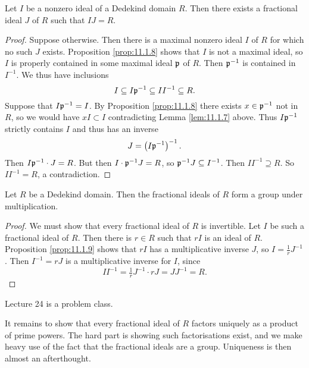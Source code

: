 \begin{proposition}
\label{prop:11.1.9}
Let $ I $ be a nonzero ideal of a Dedekind domain $ R $. Then there exists a fractional ideal $ J $ of $ R $ such that $ IJ = R $.
\end{proposition}

\begin{proof}
Suppose otherwise. Then there is a maximal nonzero ideal $ I $ of $ R $ for which no such $ J $ exists. Proposition \ref{prop:11.1.8} shows that $ I $ is not a maximal ideal, so $ I $ is properly contained in some maximal ideal $ \mathfrak{p} $ of $ R $. Then $ \mathfrak{p}^{-1} $ is contained in $ I^{-1} $. We thus have inclusions
$$ I \subseteq I\mathfrak{p}^{-1} \subseteq II^{-1} \subseteq R. $$
Suppose that $ I\mathfrak{p}^{-1} = I $. By Proposition \ref{prop:11.1.8} there exists $ x \in \mathfrak{p}^{-1} $ not in $ R $, so we would have $ xI \subset I $ contradicting Lemma \ref{lem:11.1.7} above. Thus $ I\mathfrak{p}^{-1} $ strictly contains $ I $ and thus has an inverse
$$ J = \left( I\mathfrak{p}^{-1} \right)^{-1}. $$
Then $ I\mathfrak{p}^{-1} \cdot J = R $. But then $ I \cdot \mathfrak{p}^{-1}J = R $, so $ \mathfrak{p}^{-1}J \subseteq I^{-1} $. Then $ II^{-1} \supseteq R $. So $ II^{-1} = R $, a contradiction.
\end{proof}

\begin{theorem}
Let $ R $ be a Dedekind domain. Then the fractional ideals of $ R $ form a group under multiplication.
\end{theorem}

\begin{proof}
We must show that every fractional ideal of $ R $ is invertible. Let $ I $ be such a fractional ideal of $ R $. Then there is $ r \in R $ such that $ rI $ is an ideal of $ R $. Proposition \ref{prop:11.1.9} shows that $ rI $ has a multiplicative inverse $ J $, so $ I = \tfrac{1}{r}J^{-1} $. Then $ I^{-1} = rJ $ is a multiplicative inverse for $ I $, since
$$ II^{-1} = \tfrac{1}{r}J^{-1} \cdot rJ = JJ^{-1} = R. $$
\end{proof}


Lecture 24 is a problem class.

\pagebreak


It remains to show that every fractional ideal of $ R $ factors uniquely as a product of prime powers. The hard part is showing such factorisations exist, and we make heavy use of the fact that the fractional ideals are a group. Uniqueness is then almost an afterthought.

